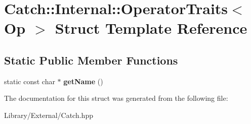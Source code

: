 \hypertarget{struct_catch_1_1_internal_1_1_operator_traits}{}\section{Catch\+:\+:Internal\+:\+:Operator\+Traits$<$ Op $>$ Struct Template Reference}
\label{struct_catch_1_1_internal_1_1_operator_traits}
\subsection*{Static Public Member Functions}
\begin{DoxyCompactItemize}
\item 
\hypertarget{struct_catch_1_1_internal_1_1_operator_traits_ac6d08082ea33348d42bc4ccbd6d07671}{}static const char $\ast$ {\bfseries get\+Name} ()\label{struct_catch_1_1_internal_1_1_operator_traits_ac6d08082ea33348d42bc4ccbd6d07671}

\end{DoxyCompactItemize}


The documentation for this struct was generated from the following file\+:\begin{DoxyCompactItemize}
\item 
Library/\+External/Catch.\+hpp\end{DoxyCompactItemize}
